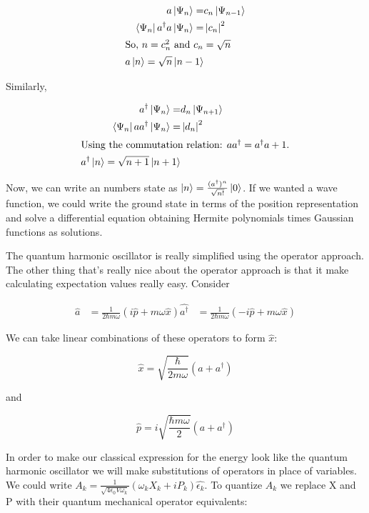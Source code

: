 \documentclass{article}
\begin{document}
\begin{align*}
    a \ket{\Psi_n} =& c_n \ket{\Psi_{n-1}} \\
    \bra{\Psi_n} a^\dagger a \ket{\Psi_n} =& \left| c_n \right|^2 \\
    \intertext{So, $n = c_n^2$ and $c_n = \sqrt{n}$}
    a \ket{n} = \sqrt{n} \ket{n-1}
\end{align*}

Similarly,

\begin{align*}
    a^\dagger \ket{\Psi_n} =& d_n \ket{\Psi_{n+1}} \\
    \bra{\Psi_n} a a^\dagger \ket{\Psi_n} =& \left| d_n \right|^2 \\
    \intertext{Using the commutation relation: $a a^\dagger = a^\dagger a + 1$.}
    a^\dagger \ket{n} = \sqrt{n+1}\ket{n+1}
\end{align*}

Now, we can write an numbers state as $\ket{n} = \frac{(a^\dagger)^n}{\sqrt{n!}}
\ket{0}$. If we wanted a wave function, we could write the ground state in terms
of the position representation and solve a differential equation obtaining
Hermite polynomials times Gaussian functions as solutions.

The quantum harmonic oscillator is really simplified using the operator
approach. The other thing that's really nice about the operator approach is that
it make calculating expectation values really easy. Consider

\begin{align*}
    \hat{a} &= \frac{1}{2\hbar m \omega} \left( i \hat{p} + m \omega \hat{x} \right)	
    \hat{a^\dagger} &= \frac{1}{2\hbar m \omega} \left( -i \hat{p} + m \omega \hat{x} \right)	
\end{align*}

We can take linear combinations of these operators to form $\hat{x}$:

\[ 
    \hat{x} = \sqrt{\frac{\hbar}{2 m \omega}} \left( a + a^\dagger \right)
\]

and

\[ 
    \hat{p} =  i \sqrt{\frac{\hbar m \omega}{2}} \left( a + a^\dagger \right)
\]

In order to make our classical expression for the energy look like the quantum
harmonic oscillator we will make substitutions of operators in place of
variables. We could write $A_k = \frac{1}{\sqrt{4 \epsilon_0 V \omega_k}} \left(
\omega_k X_k + i P_k\right) \hat{\epsilon_k}$. To quantize $A_k$ we replace X and P
with their quantum mechanical operator equivalents:
\end{document}
